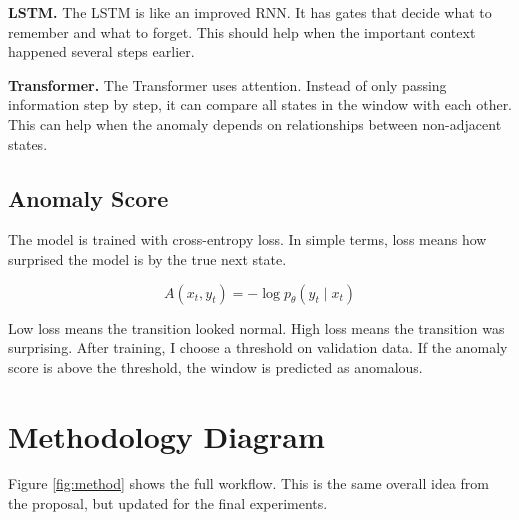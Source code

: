 \documentclass[11pt]{article}
\begin{document}
\textbf{LSTM.} The LSTM is like an improved RNN. It has gates that decide what to remember and what to forget. This should help when the important context happened several steps earlier.

\textbf{Transformer.} The Transformer uses attention. Instead of only passing information step by step, it can compare all states in the window with each other. This can help when the anomaly depends on relationships between non-adjacent states.

\subsection{Anomaly Score}

The model is trained with cross-entropy loss. In simple terms, loss means how surprised the model is by the true next state.

\[
A(x_t, y_t) = -\log p_\theta(y_t \mid x_t)
\]

Low loss means the transition looked normal. High loss means the transition was surprising. After training, I choose a threshold on validation data. If the anomaly score is above the threshold, the window is predicted as anomalous.

\section{Methodology Diagram}

Figure \ref{fig:method} shows the full workflow. This is the same overall idea from the proposal, but updated for the final experiments.
\end{document}
